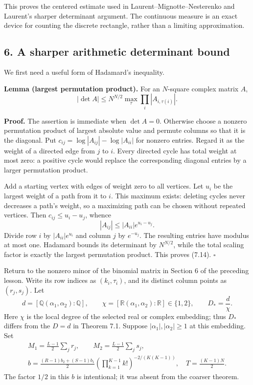 \documentclass[
  11pt,
  a4paper,
]{article}
\begin{document}
This proves the centered estimate used in Laurent--Mignotte--Nesterenko
and Laurent's sharper determinant argument. The continuous measure is an
exact device for counting the discrete rectangle, rather than a limiting
approximation.

\subsection{6. A sharper arithmetic determinant
bound}\label{a-sharper-arithmetic-determinant-bound}

We first need a useful form of Hadamard's inequality.

\textbf{Lemma (largest permutation product).} For an \(N\)-square
complex matrix \(A\), \[
|\det A|\le N^{N/2}\max_\tau\prod_i|A_{i,\tau(i)}|. \tag{7.14}
\]

\textbf{Proof.} The assertion is immediate when \(\det A=0\). Otherwise
choose a nonzero permutation product of largest absolute value and
permute columns so that it is the diagonal. Put
\(c_{ij}=\log|A_{ij}|-\log|A_{ii}|\) for nonzero entries. Regard it as
the weight of a directed edge from \(j\) to \(i\). Every directed cycle
has total weight at most zero: a positive cycle would replace the
corresponding diagonal entries by a larger permutation product.

Add a starting vertex with edges of weight zero to all vertices. Let
\(u_i\) be the largest weight of a path from it to \(i\). This maximum
exists: deleting cycles never decreases a path's weight, so a maximizing
path can be chosen without repeated vertices. Then
\(c_{ij}\le u_i-u_j\), whence \[
|A_{ij}|\le |A_{ii}|e^{u_i-u_j}.
\] Divide row \(i\) by \(|A_{ii}|e^{u_i}\) and column \(j\) by
\(e^{-u_j}\). The resulting entries have modulus at most one. Hadamard
bounds its determinant by \(N^{N/2}\), while the total scaling factor is
exactly the largest permutation product. This proves (7.14). \(\square\)

Return to the nonzero minor of the binomial matrix in Section 6 of the
preceding lesson. Write its row indices as \((k_i,\tau_i)\), and its
distinct column points as \((r_j,s_j)\). Let \[
d=[\mathbb Q(\alpha_1,\alpha_2):\mathbb Q],\qquad
\chi=[\mathbb R(\alpha_1,\alpha_2):\mathbb R]\in\{1,2\},\qquad
D_*=\frac d\chi.
\] Here \(\chi\) is the local degree of the selected real or complex
embedding; thus \(D_*\) differs from the \(D=d\) in Theorem 7.1. Suppose
\(|\alpha_1|,|\alpha_2|\ge1\) at this embedding. Set \[
\begin{gathered}
M_1=\frac{L-1}{2}\sum_jr_j,\qquad
M_2=\frac{L-1}{2}\sum_js_j,\\
b=\frac{(R-1)b_2+(S-1)b_1}{2}
\left(\prod_{k=1}^{K-1}k!\right)^{-2/(K(K-1))},
\quad T=\frac{(K-1)N}{2}.
\end{gathered} \tag{7.15}
\] The factor \(1/2\) in this \(b\) is intentional; it was absent from
the coarser theorem.
\end{document}
